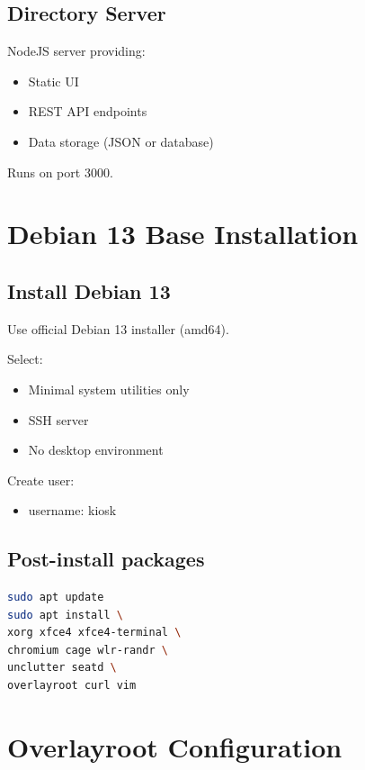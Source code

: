 \documentclass[11pt,letterpaper]{article}
\begin{document}
\subsection{Directory Server}

NodeJS server providing:

\begin{itemize}
\item Static UI
\item REST API endpoints
\item Data storage (JSON or database)
\end{itemize}

Runs on port 3000.

\section{Debian 13 Base Installation}

\subsection{Install Debian 13}

Use official Debian 13 installer (amd64).

Select:

\begin{itemize}
\item Minimal system utilities only
\item SSH server
\item No desktop environment
\end{itemize}

Create user:

\begin{itemize}
\item username: kiosk
\end{itemize}

\subsection{Post-install packages}

\begin{lstlisting}[language=bash]
sudo apt update
sudo apt install \
xorg xfce4 xfce4-terminal \
chromium cage wlr-randr \
unclutter seatd \
overlayroot curl vim
\end{lstlisting}

\section{Overlayroot Configuration}
\end{document}
